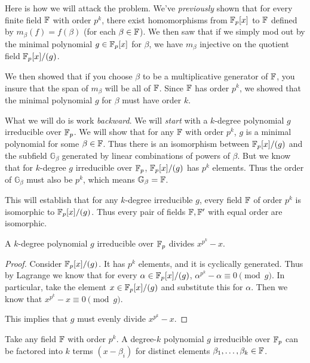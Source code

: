 \begin{remark}
  Here is how we will attack the problem. We've \emph{previously} shown
  that for every finite field $\mathbb{F}$ with order $p^k$, there exist
  homomorphisms from $\mathbb{F}_p[x]$ to $\mathbb{F}$ defined by $m_\beta(f) = f(\beta)$
  (for each $\beta \in \mathbb{F}$). We then saw that if we simply mod out by
  the minimal polynomial $g \in \mathbb{F}_p[x]$ for $\beta$, we have $m_\beta$
  injective on the quotient field $\mathbb{F}_p[x]/(g)$.

  We then showed that if you choose $\beta$ to be a multiplicative
  generator of $\mathbb{F}$, you insure that the span of $m_\beta$ will be all
  of $\mathbb{F}$. Since $\mathbb{F}$ has order $p^k$, we showed that the minimal
  polynomial $g$ for $\beta$ must have order $k$.

  What we will do is work \emph{backward}. We will \emph{start} with a
  $k$-degree polynomial $g$ irreducible over $\mathbb{F}_p$. We will show that
  for any $\mathbb{F}$ with order $p^k$, $g$ is a minimal polynomial for some
  $\beta \in \mathbb{F}$. Thus there is an isomorphism between $\mathbb{F}_p[x]/(g)$ and the
  subfield $\mathbb{G}_\beta$ generated by linear combinations of powers
  of $\beta$. But we know that for $k$-degree $g$ irreducible over
  $\mathbb{F}_p$, $\mathbb{F}_p[x]/(g)$ has $p^k$ elements. Thus the order of
  $\mathbb{G}_\beta$ must also be $p^k$, which means $\mathbb{G}_\beta =
  \mathbb{F}$.

  This will establish that for any $k$-degree irreducible $g$, every
  field $\mathbb{F}$ of order $p^k$ is isomorphic to $\mathbb{F}_p[x]/(g)$. Thus every pair
  of fields $\mathbb{F}, \mathbb{F}'$ with equal order are isomorphic.
\end{remark}

\begin{lemma}
  A $k$-degree polynomial $g$ irreducible over $\mathbb{F}_p$ divides $x^{p^k} -
  x$.
\end{lemma}

\begin{proof}
  Consider $\mathbb{F}_p[x]/(g)$. It has $p^k$ elements, and it is cyclically
  generated. Thus by Lagrange we know that for every $\alpha \in
  \mathbb{F}_p[x]/(g)$, $\alpha^{p^k} - \alpha \equiv 0 \pmod g$. In particular,
  take the element $x \in \mathbb{F}_p[x]/(g)$ and substitute this for
  $\alpha$. Then we know that $x^{p^k} - x \equiv 0 \pmod g$.

  This implies that $g$ must evenly divide $x^{p^k} - x$.
\end{proof}

\begin{lemma}
  Take any field $\mathbb{F}$ with order $p^k$. A degree-$k$ polynomial $g$
  irreducible over $\mathbb{F}_p$ can be factored into $k$ terms $(x - \beta_i)$
  for distinct elements $\beta_1, \ldots, \beta_k \in \mathbb{F}$.
\end{lemma}


